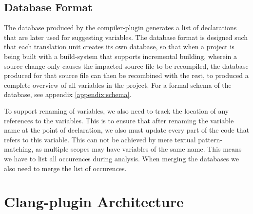 \subsection{Database Format}
\label{sec:dbfmt}
The database produced by the compiler-plugin generates a list of declarations
that are later used for suggesting variables.
The database format is designed such that each translation unit creates its own
database, so that when a project is being built with a build-system that
supports incremental building, wherein a source change only causes the impacted
source file to be recompiled, the database produced for that source file can
then be recombined with the rest, to produced a complete overview of all
variables in the project. For a formal schema of the database, see
appendix \ref{appendix:schema}.

To support renaming of variables, we also need to track the location of any
references to the variables. This is to ensure that after renaming the
variable name at the point of declaration, we also must update every part of the
code that refers to this variable. This can not be achieved by mere textual
pattern-matching, as multiple scopes may have variables of the same name. This
means we have to list all occurences during analysis. When merging the databases
we also need to merge the list of occurences.

\section{Clang-plugin Architecture}

